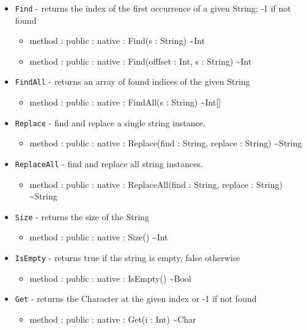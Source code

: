 \documentclass[11pt]{article}
\begin{document}
\begin{itemize}
\begin{itemize}
  \end{itemize}
\item \texttt{Find} - returns the index of the first occurrence of a
  given String; -1 if not found
  \begin{itemize}
  \item method : public : native : Find(s : String) \textasciitilde Int
  \item method : public : native : Find(offfset : Int, s : String) \textasciitilde Int
  \end{itemize}
\item \texttt{FindAll} - returns an array of found indices of the
  given String
  \begin{itemize}
  \item method : public : native : FindAll(s : String) \textasciitilde Int[]
  \end{itemize}
\item \texttt{Replace} - find and replace a single string instance.
  \begin{itemize}
  \item method : public : native : Replace(find : String, replace :
    String) \textasciitilde String
  \end{itemize}
\item \texttt{ReplaceAll} - find and replace all string instances.
  \begin{itemize}
  \item method : public : native : ReplaceAll(find : String, replace :
    String) \textasciitilde String
  \end{itemize}
\item \texttt{Size} - returns the size of the String
  \begin{itemize}
  \item method : public : native : Size() \textasciitilde Int
  \end{itemize}
\item \texttt{IsEmpty} - returns true if the string is empty, false
  otherwise
  \begin{itemize}
  \item method : public : native : IsEmpty() \textasciitilde Bool
  \end{itemize}
\item \texttt{Get} - returns the Character at the given index or -1 if
  not found
  \begin{itemize}
  \item method : public : native : Get(i : Int) \textasciitilde Char
  \end{itemize}

\end{itemize}
\end{document}
